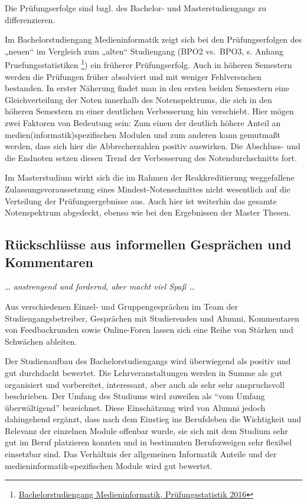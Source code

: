 Die Prüfungserfolge sind bzgl. des Bachelor- und Masterstudiengangs zu
differenzieren.

Im Bachelorstudiengang Medieninformatik zeigt sich bei den
Prüfungserfolgen des „neuen`` im Vergleich zum „alten`` Studiengang
(BPO2 vs.~BPO3, s. Anhang Pruefungsstatistiken \footnote{\href{https://th-koeln.github.io/mi-2017/anhaenge/ba-pruefungsstatistiken.pdf}{Bachelorstudiengang
  Medieninformatik, Prüfungsstatistik 2016}}) ein früherer
Prüfungserfolg. Auch in höheren Semestern werden die Prüfungen früher
absolviert und mit weniger Fehlversuchen bestanden. In erster Näherung
findet man in den ersten beiden Semestern eine Gleichverteilung der
Noten innerhalb des Notenspektrums, die sich in den höheren Semestern zu
einer deutlichen Verbesserung hin verschiebt. Hier mögen zwei Faktoren
von Bedeutung sein: Zum einen der deutlich höhere Anteil an
medien(informatik)spezifischen Modulen und zum anderen kann gemutmaßt
werden, dass sich hier die Abbrecherzahlen positiv auswirken. Die
Abschluss- und die Endnoten setzen diesen Trend der Verbesserung des
Notendurchschnitts fort.

Im Masterstudium wirkt sich die im Rahmen der Reakkreditierung
weggefallene Zulassungsvoraussetzung eines Mindest-Notenschnittes nicht
wesentlich auf die Verteilung der Prüfungsergebnisse aus. Auch hier ist
weiterhin das gesamte Notenspektrum abgedeckt, ebenso wie bei den
Ergebnissen der Master Thesen.

\subsection{Rückschlüsse aus informellen Gesprächen und
Kommentaren}\label{ruxfcckschluxfcsse-aus-informellen-gespruxe4chen-und-kommentaren}

\emph{\ldots{} anstrengend und fordernd, aber macht viel Spaß \ldots{}}

Aus verschiedenen Einzel- und Gruppengesprächen im Team der
Studiengangsbetreiber, Gesprächen mit Studierenden und Alumni,
Kommentaren von Feedbackrunden sowie Online-Foren lassen sich eine Reihe
von Stärken und Schwächen ableiten.

Der Studienaufbau des Bachelorstudiengangs wird überwiegend als positiv
und gut durchdacht bewertet. Die Lehrveranstaltungen werden in Summe als
gut organisiert und vorbereitet, interessant, aber auch als sehr sehr
anspruchsvoll beschrieben. Der Umfang des Studiums wird zuweilen als
``vom Umfang überwältigend'' bezeichnet. Diese Einschätzung wird von
Alumni jedoch dahingehend ergänzt, dass nach dem Einstieg ins
Berufsleben die Wichtigkeit und Relevanz der einzelnen Module offenbar
wurde, sie sich mit dem Studium sehr gut im Beruf platzieren konnten und
in bestimmten Berufszweigen sehr flexibel einsetzbar sind. Das
Verhältnis der allgemeinen Informatik Anteile und der
medieninformatik-spezifischen Module wird gut bewertet.

